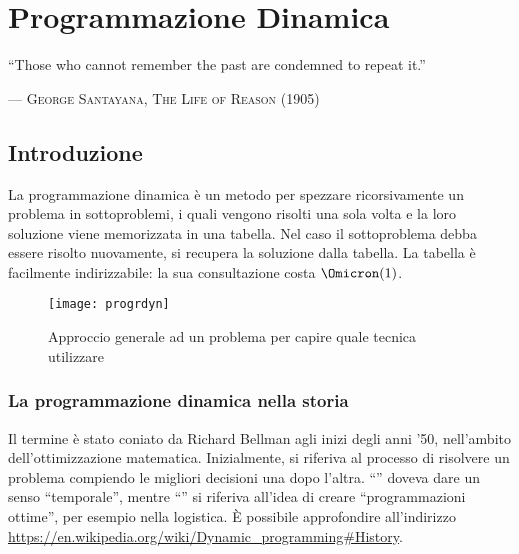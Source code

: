 
\ifsubfile
\usepackage[newfloat, cachedir=_minted-cache, outputdir=../build]{minted}
\usepackage{../libraries/set-minted}

\pagestyle{plain}
\setcounter{chapter}{12}


\fi
\chapter{Programmazione Dinamica}
\epigraph{``Those who cannot remember the past are condemned to repeat it.''}%
         {--- \textup{\textsc{George Santayana, The Life of Reason (1905)}}}

\section*{Introduzione}

La programmazione dinamica è un metodo per spezzare ricorsivamente un problema in
sottoproblemi, i quali vengono risolti una sola volta e la loro soluzione viene memorizzata in una tabella.
Nel caso il sottoproblema debba essere risolto nuovamente, si recupera la soluzione dalla tabella.
La tabella è facilmente indirizzabile: la sua consultazione costa \(\Omicron(1)\).

\begin{figure}[H]\centering
    \texttt{[image: progrdyn]}
    \caption{Approccio generale ad un problema per capire quale tecnica utilizzare}
\end{figure}

\subsection*{La programmazione dinamica nella storia}

Il termine  è stato coniato da Richard Bellman agli inizi degli anni '50, nell'ambito dell'ottimizzazione matematica.
Inizialmente, si riferiva al processo di risolvere un problema compiendo le migliori decisioni una dopo l'altra.
\enquote{} doveva dare un senso \enquote{temporale}, mentre \enquote{} si riferiva all'idea di creare \enquote{programmazioni ottime}, per esempio nella logistica.
\`{E} possibile approfondire all'indirizzo \url{https://en.wikipedia.org/wiki/Dynamic_programming#History}.

